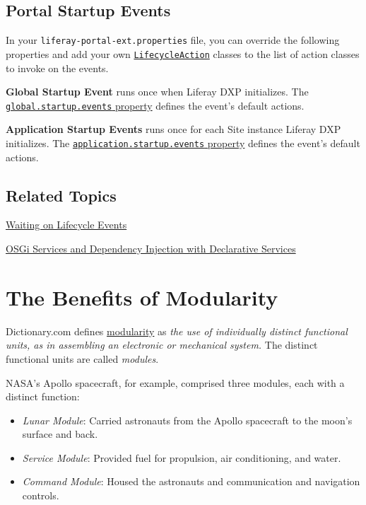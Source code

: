 \section{Portal Startup Events}\label{portal-startup-events}

In your \texttt{liferay-portal-ext.properties} file, you can override
the following properties and add your own
\href{https://docs.liferay.com/dxp/portal/7.2-latest/javadocs/portal-kernel/com/liferay/portal/kernel/events/LifecycleAction.html}{\texttt{LifecycleAction}}
classes to the list of action classes to invoke on the events.

\textbf{Global Startup Event} runs once when Liferay DXP initializes.
The
\href{https://docs.liferay.com/dxp/portal/7.2-latest/propertiesdoc/portal.properties.html\#Startup\%20Events}{\texttt{global.startup.events}
property} defines the event's default actions.

\textbf{Application Startup Events} runs once for each Site instance
Liferay DXP initializes. The
\href{https://docs.liferay.com/dxp/portal/7.2-latest/propertiesdoc/portal.properties.html\#Startup\%20Events}{\texttt{application.startup.events}
property} defines the event's default actions.

\section{Related Topics}\label{related-topics-9}

\href{/docs/7-2/customization/-/knowledge_base/c/waiting-on-lifecycle-events}{Waiting
on Lifecycle Events}

\href{/docs/7-2/frameworks/-/knowledge_base/f/declarative-services}{OSGi
Services and Dependency Injection with Declarative Services}

\chapter{The Benefits of Modularity}\label{the-benefits-of-modularity}

Dictionary.com defines
\href{http://www.dictionary.com/browse/modularity}{modularity} as
\emph{the use of individually distinct functional units, as in
assembling an electronic or mechanical system.} The distinct functional
units are called \emph{modules}.

NASA's Apollo spacecraft, for example, comprised three modules, each
with a distinct function:

\begin{itemize}
\tightlist
\item
  \emph{Lunar Module}: Carried astronauts from the Apollo spacecraft to
  the moon's surface and back.
\item
  \emph{Service Module}: Provided fuel for propulsion, air conditioning,
  and water.
\item
  \emph{Command Module}: Housed the astronauts and communication and
  navigation controls.
\end{itemize}

